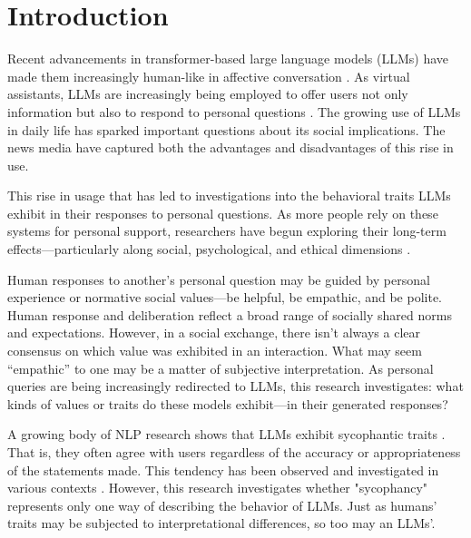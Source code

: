\chapter{Introduction}

Recent advancements in transformer-based large language models (LLMs) have made them increasingly human-like in affective conversation \cite{humangpt}. As virtual assistants, LLMs are increasingly being employed to offer users not only information but also to respond to personal questions \cite{zhang-ai_companions, phang-affective, anthropic2025}. The growing use of LLMs in daily life has sparked important questions about its social implications. The news media have captured both the advantages \cite{guardian2025-chatgpt-conversation} and disadvantages \cite{nyt2024-characterai-lawsuit} of this rise in use.

This rise in usage that has led to investigations into the behavioral traits LLMs exhibit in their responses to personal questions. As more people rely on these systems for personal support, researchers have begun exploring their long-term effects—particularly along social, psychological, and ethical dimensions \cite{cot-morals,sorin-etal-empathy,fang-etal-psychoeffects}.

Human responses to another's personal question may be guided by personal experience or normative social values—be helpful, be empathic, and be polite. Human response and deliberation reflect a broad range of socially shared norms and expectations. However, in a social exchange, there isn't always a clear consensus on which value was exhibited in an interaction. What may seem “empathic” to one may be a matter of subjective interpretation. As personal queries are being increasingly redirected to LLMs, this research investigates: what kinds of values or traits do these models exhibit—in their generated responses?

A growing body of NLP research shows that LLMs exhibit sycophantic traits \cite{sycophancy-iclr, socialgaze}. That is, they often agree with users regardless of the accuracy or appropriateness of the statements made. This tendency has been observed and investigated in various contexts \cite{syceval, edi-sycophancy}. However, this research investigates whether "sycophancy" represents only one way of describing the behavior of LLMs. Just as humans' traits may be subjected to interpretational differences, so too may an LLMs'. 

